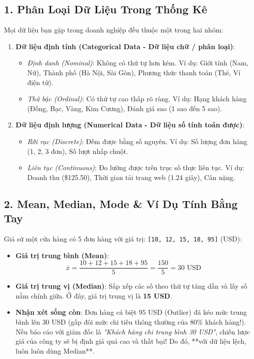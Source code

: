 \subsection{1. Phân Loại Dữ Liệu Trong Thống Kê}
Mọi dữ liệu bạn gặp trong doanh nghiệp đều thuộc một trong hai nhóm:
\begin{enumerate}
    \item \textbf{Dữ liệu định tính (Categorical Data - Dữ liệu chữ / phân loại)}:
    \begin{itemize}
        \item \textit{Định danh (Nominal)}: Không có thứ tự hơn kém. Ví dụ: Giới tính (Nam, Nữ), Thành phố (Hà Nội, Sài Gòn), Phương thức thanh toán (Thẻ, Ví điện tử).
        \item \textit{Thứ bậc (Ordinal)}: Có thứ tự cao thấp rõ ràng. Ví dụ: Hạng khách hàng (Đồng, Bạc, Vàng, Kim Cương), Đánh giá sao (1 sao đến 5 sao).
    \end{itemize}
    \item \textbf{Dữ liệu định lượng (Numerical Data - Dữ liệu số tính toán được)}:
    \begin{itemize}
        \item \textit{Rời rạc (Discrete)}: Đếm được bằng số nguyên. Ví dụ: Số lượng đơn hàng (1, 2, 3 đơn), Số lượt nhấp chuột.
        \item \textit{Liên tục (Continuous)}: Đo lường được trên trục số thực liên tục. Ví dụ: Doanh thu (\$125.50), Thời gian tải trang web (1.24 giây), Cân nặng.
    \end{itemize}
\end{enumerate}

\subsection{2. Mean, Median, Mode \& Ví Dụ Tính Bằng Tay}

Giả sử một cửa hàng có 5 đơn hàng với giá trị: \texttt{[10, 12, 15, 18, 95]} (USD):
\begin{itemize}
    \item \textbf{Giá trị trung bình (Mean)}: 
    \[
    \bar{x} = \frac{10 + 12 + 15 + 18 + 95}{5} = \frac{150}{5} = 30\text{ USD}
    \]
    \item \textbf{Giá trị trung vị (Median)}: Sắp xếp các số theo thứ tự tăng dần và lấy số nằm chính giữa. Ở đây, giá trị trung vị là \textbf{15 USD}.
    \item \textbf{Nhận xét sống còn}: Đơn hàng cá biệt 95 USD (Outlier) đã kéo mức trung bình lên 30 USD (gấp đôi mức chi tiêu thông thường của 80\% khách hàng!). Nếu báo cáo với giám đốc là \textit{"Khách hàng chi trung bình 30 USD"}, chiến lược giá của công ty sẽ bị định giá quá cao và thất bại! Do đó, **với dữ liệu lệch, luôn luôn dùng Median**.
\end{itemize}

